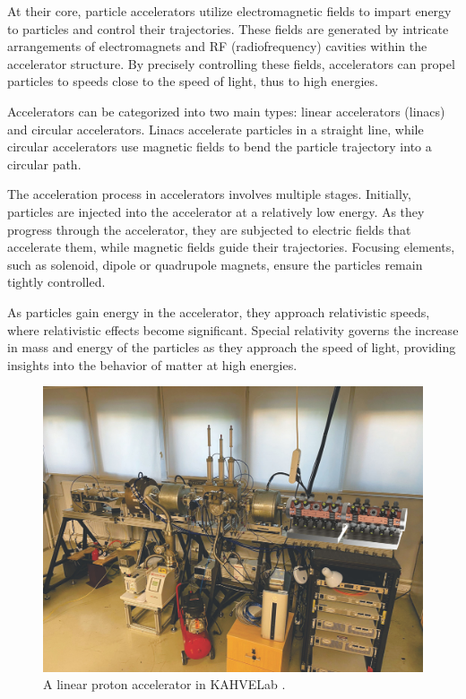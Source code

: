 \documentclass[a4paper,oneside,12pt]{report}
\numberwithin{equation}{chapter}
\begin{document}
At their core, particle accelerators utilize electromagnetic fields to impart energy to particles and control their trajectories. 
These fields are generated by intricate arrangements of electromagnets and RF (radiofrequency) cavities within the accelerator structure. 
By precisely controlling these fields, accelerators can propel particles to speeds close to the speed of light, thus to high energies.

Accelerators can be categorized into two main types: linear accelerators (linacs) and circular accelerators. 
Linacs accelerate particles in a straight line, while circular accelerators use magnetic fields to bend the particle trajectory into a circular path. 

The acceleration process in accelerators involves multiple stages. Initially, particles are injected into the accelerator at a relatively low energy. 
As they progress through the accelerator, they are subjected to electric fields that accelerate them, while magnetic fields guide their trajectories.
Focusing elements, such as solenoid, dipole or quadrupole magnets, ensure the particles remain tightly controlled.

As particles gain energy in the accelerator, they approach relativistic speeds, where relativistic effects become significant. 
Special relativity governs the increase in mass and energy of the particles as they approach the speed of light, providing insights into the behavior of matter at high energies.

\vspace{22pt}
\begin{figure}[H]
    \centering
    \includegraphics[width=.7\textwidth]{./figures/kahvelab_linac.png}
    \vspace{-1pt}
    \caption{A linear proton accelerator in KAHVELab \cite{kahvelab_linac}.}
\end{figure}
\end{document}
